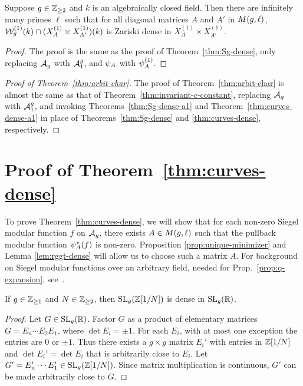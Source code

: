\documentclass{amsart}
\begin{document}
\begin{theorem}\label{thm:Sg-dense-a1}
  Suppose $g\in\mathbb{Z}_{\ge 2}$ and $k$ is an algebraically closed field. Then there are infinitely many primes $\ell$ such that for all diagonal matrices $A$ and $A'$ in $M(g,\ell)$, $\mathcal{W}_g^{(1)}(k) \cap (X^{(1)}_A \times X^{(1)}_{A'})(k)$ is Zariski dense in $X^{(1)}_A \times X^{(1)}_{A'}$.
\end{theorem}

\begin{proof}
  The proof is the same as the proof of Theorem~\ref{thm:Sg-dense}, only replacing $\mathcal{A}_g$ with $\mathcal{A}_1^g$, and $\psi_{A}$ with $\psi_{A}^{(1)}$.
\end{proof}

\begin{proof}[Proof of Theorem~\ref{thm:arbit-char}]
  The proof of Theorem~\ref{thm:arbit-char} is almost the same as that of Theorem~\ref{thm:invariant-c-constant}, replacing $\mathcal{A}_g$  with $\mathcal{A}_1^g$, and invoking Theorems~\ref{thm:Sg-dense-a1} and  Theorem~\ref{thm:curves-dense-a1} in place of Theorems~\ref{thm:Sg-dense} and \ref{thm:curves-dense}, respectively.
\end{proof}








\section{Proof of Theorem~\ref{thm:curves-dense}}
\label{sec:step-1}

To prove Theorem~\ref{thm:curves-dense}, we will show that for each non-zero Siegel modular function $f$ on $\mathcal{A}_g$, there exists $A \in M(g,\ell)$ such that the pullback modular function $\psi_{A}^*(f)$ is non-zero.
Proposition \ref{prop:unique-minimizer} and Lemma \ref{lem:rggt-dense} will allow us to choose such a matrix $A$. For background on Siegel modular functions over an arbitrary field, needed for Prop.~\ref{prop:q-expansion}, see~\cite[\S{}V.1]{faltings1990degeneration}.


\begin{lemma}\label{lem:sl-dense}
  If $g\in\mathbb{Z}_{\ge 1}$ and $N\in\mathbb{Z}_{\ge 2}$, then $\operatorname{SL}_g(\mathbb{Z}[1/N])$ is dense in $\operatorname{SL}_g(\mathbb{R})$.
\end{lemma}
\begin{proof}
  Let $G \in \operatorname{SL}_g(\mathbb{R})$. Factor $G$ as a product of elementary matrices $G = E_n \cdots E_2 E_1$, where $\det E_i = \pm 1$. For each $E_i$, with at most one exception the entries are $0$ or $\pm 1$. Thus there exists a $g \times g$ matrix $E_i'$ with entries in $\mathbb{Z}[1/N]$ and $\det E_i' = \det E_i$ that is arbitrarily close to $E_i$. Let $G' = E_n' \cdots E_1' \in \operatorname{SL}_g(\mathbb{Z}[1/N])$. Since matrix multiplication is continuous, $G'$ can be made arbitrarily close to $G$.
\end{proof}
\end{document}
